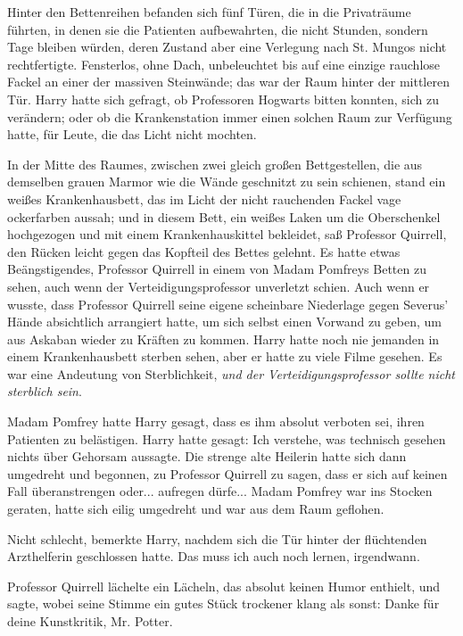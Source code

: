 Hinter den Bettenreihen befanden sich fünf Türen, die in die Privaträume
führten, in denen sie die Patienten aufbewahrten, die nicht Stunden, sondern
Tage bleiben würden, deren Zustand aber eine Verlegung nach St. Mungos nicht
rechtfertigte. Fensterlos, ohne Dach, unbeleuchtet bis auf eine einzige
rauchlose Fackel an einer der massiven Steinwände; das war der Raum hinter der
mittleren Tür. Harry hatte sich gefragt, ob Professoren Hogwarts bitten konnten,
sich zu verändern; oder ob die Krankenstation immer einen solchen Raum zur
Verfügung hatte, für Leute, die das Licht nicht mochten.

In der Mitte des Raumes, zwischen zwei gleich großen Bettgestellen, die aus
demselben grauen Marmor wie die Wände geschnitzt zu sein schienen, stand ein
weißes Krankenhausbett, das im Licht der nicht rauchenden Fackel vage
ockerfarben aussah; und in diesem Bett, ein weißes Laken um die Oberschenkel
hochgezogen und mit einem Krankenhauskittel bekleidet, saß Professor Quirrell,
den Rücken leicht gegen das Kopfteil des Bettes gelehnt. Es hatte etwas
Beängstigendes, Professor Quirrell in einem von Madam Pomfreys Betten zu sehen,
auch wenn der Verteidigungsprofessor unverletzt schien. Auch wenn er wusste,
dass Professor Quirrell seine eigene scheinbare Niederlage gegen Severus' Hände
absichtlich arrangiert hatte, um sich selbst einen Vorwand zu geben, um aus
Askaban wieder zu Kräften zu kommen. Harry hatte noch nie jemanden in einem
Krankenhausbett sterben sehen, aber er hatte zu viele Filme gesehen. Es war eine
Andeutung von Sterblichkeit, \emph{und der Verteidigungsprofessor sollte nicht
sterblich sein}.

Madam Pomfrey hatte Harry gesagt, dass es ihm absolut verboten sei, ihren
Patienten zu belästigen. Harry hatte gesagt: \glqq{}Ich verstehe\grqq{}, was
technisch gesehen nichts über Gehorsam aussagte. Die strenge alte Heilerin hatte
sich dann umgedreht und begonnen, zu Professor Quirrell zu sagen, dass er sich
auf keinen Fall überanstrengen oder... aufregen dürfe... Madam Pomfrey war ins
Stocken geraten, hatte sich eilig umgedreht und war aus dem Raum geflohen.

\glqq{}Nicht schlecht\grqq{}, bemerkte Harry, nachdem sich die Tür hinter der
flüchtenden Arzthelferin geschlossen hatte. \glqq{}Das muss ich auch noch lernen,
irgendwann.\grqq{}

Professor Quirrell lächelte ein Lächeln, das absolut keinen Humor enthielt, und
sagte, wobei seine Stimme ein gutes Stück trockener klang als sonst: \glqq{}Danke
für deine Kunstkritik, Mr. Potter.\grqq{}

